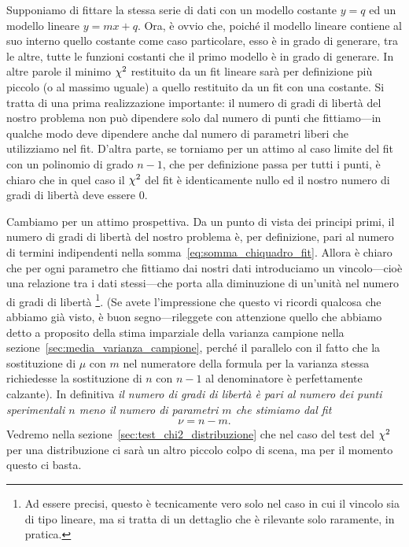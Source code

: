Supponiamo di fittare la stessa serie di dati con un modello costante $y = q$
ed un modello lineare $y = mx + q$. Ora, è ovvio che, poiché il modello
lineare contiene al suo interno quello costante come caso particolare, esso è
in grado di generare, tra le altre, tutte le funzioni costanti che il primo
modello è in grado di generare. In altre parole il minimo $\chi^2$ restituito
da un fit lineare sarà per definizione più piccolo (o al massimo uguale) a
quello restituito da un fit con una costante. Si tratta di una prima
realizzazione importante: il numero di gradi di libertà del nostro problema
non può dipendere solo dal numero di punti che fittiamo---in qualche modo
deve dipendere anche dal numero di parametri liberi che utilizziamo nel fit.
D'altra parte, se torniamo per un attimo al caso limite del fit con un
polinomio di grado $n - 1$, che per definizione passa per tutti i punti, è
chiaro che in quel caso il $\chi^2$ del fit è identicamente nullo ed
il nostro numero di gradi di libertà deve essere $0$.

Cambiamo per un attimo prospettiva. Da un punto di vista dei principi primi,
il numero di gradi di libertà del nostro problema è, per definizione, pari
al numero di termini indipendenti nella somma~\eqref{eq:somma_chiquadro_fit}.
Allora è chiaro che per ogni parametro che fittiamo dai nostri dati
introduciamo un vincolo---cioè una relazione tra i dati stessi---che porta
alla diminuzione di un'unità nel numero di gradi di libertà%
\footnote{Ad essere precisi, questo è tecnicamente vero solo nel caso in cui
  il vincolo sia di tipo lineare, ma si tratta di un dettaglio che è
  rilevante solo raramente, in pratica.}.
(Se avete l'impressione che questo vi ricordi qualcosa che abbiamo già visto,
è buon segno---rileggete con attenzione quello che abbiamo detto a proposito
della stima imparziale della varianza campione nella
sezione~\ref{sec:media_varianza_campione}, perché il parallelo con il fatto
che la sostituzione di $\mu$ con $m$ nel numeratore della formula per la
varianza stessa richiedesse la sostituzione di $n$ con $n-1$ al denominatore è
perfettamente calzante).
In definitiva \emph{il numero di gradi di libertà è pari al numero dei punti
  sperimentali $n$ meno il numero di parametri $m$ che stimiamo dal fit}
\begin{align}\label{eq:ndof_fit_punti}
  \nu = n - m.
\end{align}
Vedremo nella sezione~\ref{sec:test_chi2_distribuzione} che nel caso del test
del $\chi^2$ per una distribuzione ci sarà un altro piccolo colpo di scena,
ma per il momento questo ci basta.

